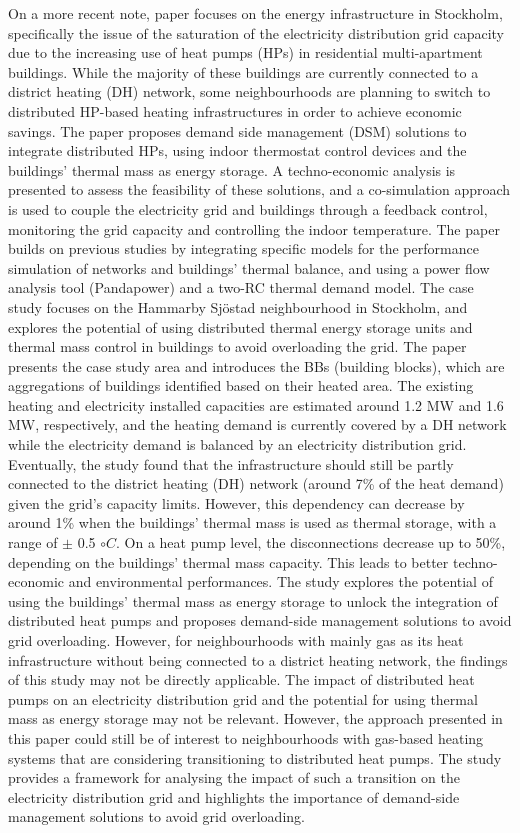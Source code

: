 On a more recent note, paper \cite{ARNAUDO2020117012} focuses on the energy infrastructure in Stockholm, specifically the issue of the saturation of the electricity distribution grid capacity due to the increasing use of heat pumps (HPs) in residential multi-apartment buildings. While the majority of these buildings are currently connected to a district heating (DH) network, some neighbourhoods are planning to switch to distributed HP-based heating infrastructures in order to achieve economic savings. The paper proposes demand side management (DSM) solutions to integrate distributed HPs, using indoor thermostat control devices and the buildings' thermal mass as energy storage. A techno-economic analysis is presented to assess the feasibility of these solutions, and a co-simulation approach is used to couple the electricity grid and buildings through a feedback control, monitoring the grid capacity and controlling the indoor temperature. The paper builds on previous studies by integrating specific models for the performance simulation of networks and buildings' thermal balance, and using a power flow analysis tool (Pandapower) and a two-RC thermal demand model. The case study focuses on the Hammarby Sjöstad neighbourhood in Stockholm, and explores the potential of using distributed thermal energy storage units and thermal mass control in buildings to avoid overloading the grid. The paper presents the case study area and introduces the BBs (building blocks), which are aggregations of buildings identified based on their heated area. The existing heating and electricity installed capacities are estimated around 1.2 MW and 1.6 MW, respectively, and the heating demand is currently covered by a DH network while the electricity demand is balanced by an electricity distribution grid. Eventually, the study found that the infrastructure should still be partly connected to the district heating (DH) network (around 7\% of the heat demand) given the grid’s capacity limits. However, this dependency can decrease by around 1\% when the buildings’ thermal mass is used as thermal storage, with a range of $\pm$ 0.5 $\circ C$. On a heat pump level, the disconnections decrease up to 50\%, depending on the buildings’ thermal mass capacity. This leads to better techno-economic and environmental performances. The study explores the potential of using the buildings’ thermal mass as energy storage to unlock the integration of distributed heat pumps and proposes demand-side management solutions to avoid grid overloading. However, for neighbourhoods with mainly gas as its heat infrastructure without being connected to a district heating network, the findings of this study may not be directly applicable. The impact of distributed heat pumps on an electricity distribution grid and the potential for using thermal mass as energy storage may not be relevant. However, the approach presented in this paper could still be of interest to neighbourhoods with gas-based heating systems that are considering transitioning to distributed heat pumps. The study provides a framework for analysing the impact of such a transition on the electricity distribution grid and highlights the importance of demand-side management solutions to avoid grid overloading. 

